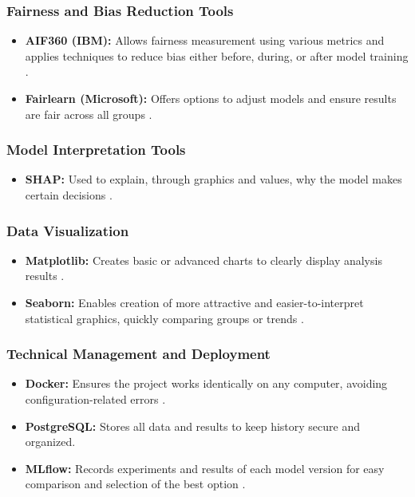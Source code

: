 \subsubsection{Fairness and Bias Reduction Tools}

\begin{itemize}
    \item \textbf{AIF360 (IBM):} Allows fairness measurement using various metrics and applies techniques to reduce bias either before, during, or after model training \cite{aif360_github}.
    
    \item \textbf{Fairlearn (Microsoft):} Offers options to adjust models and ensure results are fair across all groups \cite{fairlearn_org}.
\end{itemize}

\subsubsection{Model Interpretation Tools}

\begin{itemize}
    \item \textbf{SHAP:} Used to explain, through graphics and values, why the model makes certain decisions \cite{shap_intro}.
\end{itemize}

\subsubsection{Data Visualization}

\begin{itemize}
    \item \textbf{Matplotlib:} Creates basic or advanced charts to clearly display analysis results \cite{matplotlib_org}.
    
    \item \textbf{Seaborn:} Enables creation of more attractive and easier-to-interpret statistical graphics, quickly comparing groups or trends \cite{seaborn_org}.
\end{itemize}

\subsubsection{Technical Management and Deployment}

\begin{itemize}
    \item \textbf{Docker:} Ensures the project works identically on any computer, avoiding configuration-related errors \cite{kdnuggets_pipeline}.
    
    \item \textbf{PostgreSQL:} Stores all data and results to keep history secure and organized.
    
    \item \textbf{MLflow:} Records experiments and results of each model version for easy comparison and selection of the best option \cite{datacamp_mlops}.
\end{itemize}

